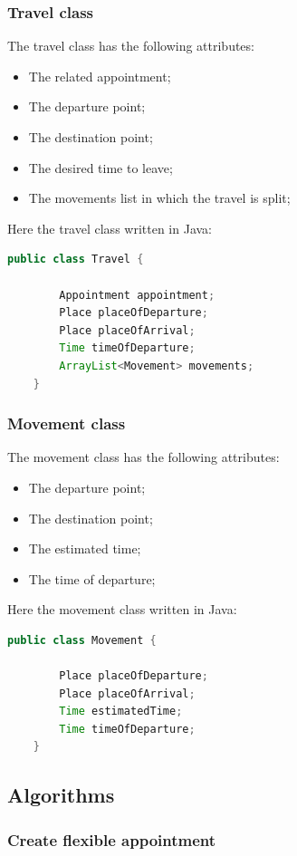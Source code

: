 \subsubsection{Travel class}

The travel class has the following attributes:
\begin{itemize}
	\item The related appointment;
	\item The departure point;
	\item The destination point;
	\item The desired time to leave;
	\item The movements list in which the travel is split;
\end{itemize}

Here the travel class written in Java:
\begin{lstlisting}[language=Java]
	public class Travel {
	
		Appointment appointment;
		Place placeOfDeparture;
		Place placeOfArrival;
		Time timeOfDeparture;
		ArrayList<Movement> movements;
	}
\end{lstlisting}

\subsubsection{Movement class}

The movement class has the following attributes:
\begin{itemize}
	\item The departure point;
	\item The destination point;
	\item The estimated time;
	\item The time of departure;
\end{itemize}

Here the movement class written in Java:
\begin{lstlisting}[language=Java]
	public class Movement {
		
		Place placeOfDeparture;
		Place placeOfArrival;
		Time estimatedTime;
		Time timeOfDeparture;
	}
\end{lstlisting}

\subsection{Algorithms}

\subsubsection{Create flexible appointment}

